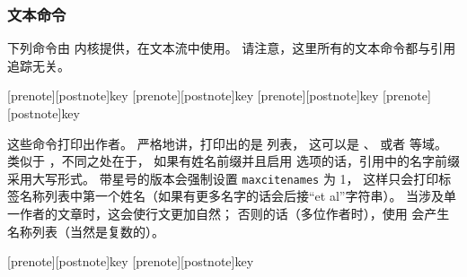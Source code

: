 \subsubsection{文本命令}%
\label{use:cit:txt}


下列命令由 \biblatex 内核提供，在文本流中使用。
请注意，这里所有的文本命令都与引用追踪无关。

\begin{ltxsyntax}

[prenote][postnote]{key}
[prenote][postnote]{key}
[prenote][postnote]{key}
[prenote][postnote]{key}


这些命令打印出作者。
严格地讲，打印出的是  列表，
这可以是 、 或者  等域。
 类似于 ，不同之处在于，
如果有姓名前缀并且启用   选项的话，引用中的名字前缀采用大写形式。
带星号的版本会强制设置 \texttt{maxcitenames} 为 1，
这样只会打印标签名称列表中第一个姓名（如果有更多名字的话会后接“et al”字符串）。
当涉及单一作者的文章时，这会使行文更加自然；
否则的话（多位作者时），使用  会产生名称列表（当然是复数的）。


[prenote][postnote]{key}
[prenote][postnote]{key}


\end{ltxsyntax}
